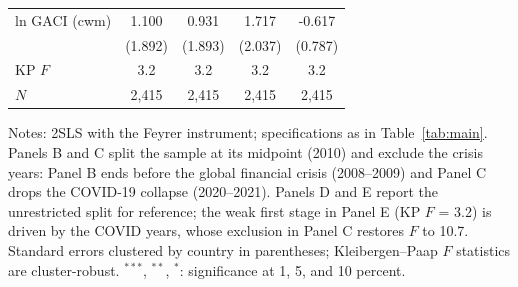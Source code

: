 \begin{table}[htbp]
\begin{threeparttable}
\begin{tabular}{lcccc}
  ln GACI (cwm) & 1.100 & 0.931 & 1.717 & -0.617 \\
   & (1.892) & (1.893) & (2.037) & (0.787) \\
  KP $F$ & 3.2 & 3.2 & 3.2 & 3.2 \\
  $N$ & 2,415 & 2,415 & 2,415 & 2,415 \\
\bottomrule
\end{tabular}
\begin{tablenotes}[flushleft]
\footnotesize
\item Notes: 2SLS with the Feyrer instrument; specifications as in Table~\ref{tab:main}. Panels B and C split the sample at its midpoint (2010) and exclude the crisis years: Panel B ends before the global financial crisis (2008--2009) and Panel C drops the COVID-19 collapse (2020--2021). Panels D and E report the unrestricted split for reference; the weak first stage in Panel E (KP $F$ = 3.2) is driven by the COVID years, whose exclusion in Panel C restores $F$ to 10.7. Standard errors clustered by country in parentheses; Kleibergen--Paap $F$ statistics are cluster-robust. $^{***}$, $^{**}$, $^{*}$: significance at 1, 5, and 10 percent.
\end{tablenotes}
\end{threeparttable}
\end{table}

